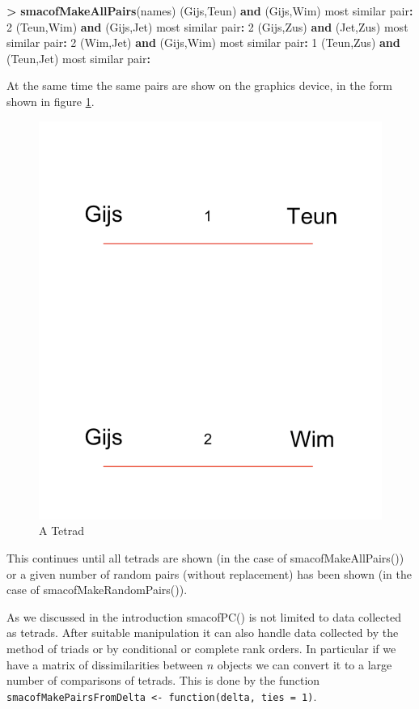 \documentclass[
  12pt,
]{article}
\newenvironment{Shaded}{\begin{snugshade}}{\end{snugshade}}
\newcommand{\DecValTok}[1]{\textcolor[rgb]{0.00,0.00,0.81}{#1}}
\newcommand{\FunctionTok}[1]{\textcolor[rgb]{0.13,0.29,0.53}{\textbf{#1}}}
\newcommand{\NormalTok}[1]{#1}
\newcommand{\SpecialCharTok}[1]{\textcolor[rgb]{0.81,0.36,0.00}{\textbf{#1}}}
\begin{document}
\begin{Shaded}
\begin{Highlighting}[]
\SpecialCharTok{\textgreater{}} \FunctionTok{smacofMakeAllPairs}\NormalTok{(names)}
\NormalTok{(Gijs,Teun) }\FunctionTok{and}\NormalTok{ (Gijs,Wim)}
\NormalTok{most similar pair}\SpecialCharTok{:} \DecValTok{2}
\NormalTok{(Teun,Wim) }\FunctionTok{and}\NormalTok{ (Gijs,Jet)}
\NormalTok{most similar pair}\SpecialCharTok{:} \DecValTok{2}
\NormalTok{(Gijs,Zus) }\FunctionTok{and}\NormalTok{ (Jet,Zus)}
\NormalTok{most similar pair}\SpecialCharTok{:} \DecValTok{2}
\NormalTok{(Wim,Jet) }\FunctionTok{and}\NormalTok{ (Gijs,Wim)}
\NormalTok{most similar pair}\SpecialCharTok{:} \DecValTok{1}
\NormalTok{(Teun,Zus) }\FunctionTok{and}\NormalTok{ (Teun,Jet)}
\NormalTok{most similar pair}\SpecialCharTok{:}
\end{Highlighting}
\end{Shaded}

At the same time the same pairs are show on the graphics device, in the form shown in figure \ref{fig:hoogeveenpng}.

\begin{figure}

{\centering \includegraphics[width=0.3\linewidth]{graphics/hoogeveen} 

}

\caption{A Tetrad}\label{fig:hoogeveenpng}
\end{figure}

This continues until all tetrads are shown (in the case of
smacofMakeAllPairs()) or a given number of random pairs (without
replacement) has been shown (in the case of smacofMakeRandomPairs()).

As we discussed in the introduction smacofPC() is not limited to data
collected as tetrads. After suitable manipulation it can also
handle data collected by the method of triads or by conditional or complete
rank orders. In particular if we have a matrix of
dissimilarities between \(n\) objects we can convert it to a large number of comparisons of tetrads. This is done by the function
\texttt{smacofMakePairsFromDelta\ \textless{}-\ function(delta,\ ties\ =\ 1)}.
\end{document}
